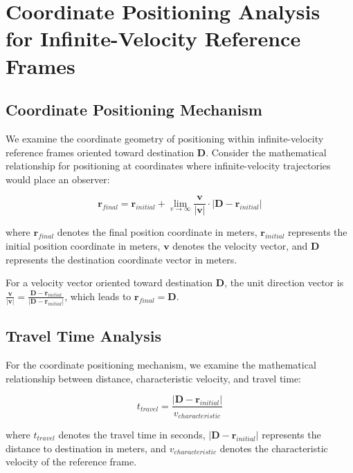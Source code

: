\documentclass[12pt,a4paper]{article}
\begin{document}
\section{Coordinate Positioning Analysis for Infinite-Velocity Reference Frames}

\subsection{Coordinate Positioning Mechanism}

We examine the coordinate geometry of positioning within infinite-velocity reference frames oriented toward destination $\mathbf{D}$. Consider the mathematical relationship for positioning at coordinates where infinite-velocity trajectories would place an observer:

\begin{equation}
\mathbf{r}_{final} = \mathbf{r}_{initial} + \lim_{v \to \infty} \frac{\mathbf{v}}{|\mathbf{v}|} \cdot |\mathbf{D} - \mathbf{r}_{initial}|
\end{equation}

where $\mathbf{r}_{final}$ denotes the final position coordinate in meters, $\mathbf{r}_{initial}$ represents the initial position coordinate in meters, $\mathbf{v}$ denotes the velocity vector, and $\mathbf{D}$ represents the destination coordinate vector in meters.

For a velocity vector oriented toward destination $\mathbf{D}$, the unit direction vector is $\frac{\mathbf{v}}{|\mathbf{v}|} = \frac{\mathbf{D} - \mathbf{r}_{initial}}{|\mathbf{D} - \mathbf{r}_{initial}|}$, which leads to $\mathbf{r}_{final} = \mathbf{D}$.

\subsection{Travel Time Analysis}

For the coordinate positioning mechanism, we examine the mathematical relationship between distance, characteristic velocity, and travel time:

\begin{equation}
t_{travel} = \frac{|\mathbf{D} - \mathbf{r}_{initial}|}{v_{characteristic}}
\end{equation}

where $t_{travel}$ denotes the travel time in seconds, $|\mathbf{D} - \mathbf{r}_{initial}|$ represents the distance to destination in meters, and $v_{characteristic}$ denotes the characteristic velocity of the reference frame.
\end{document}
